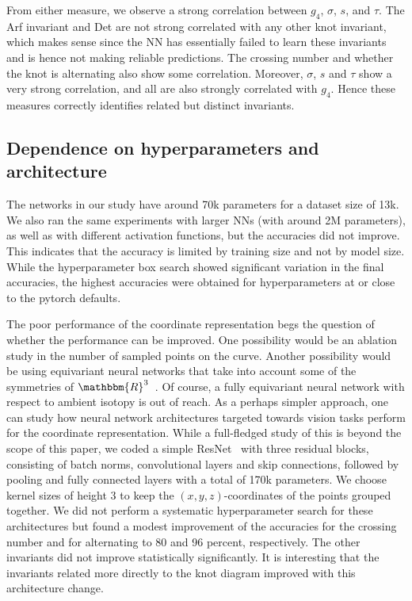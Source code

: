 \documentclass[11pt]{article}
\numberwithin{equation}{section}
\begin{document}
From either measure, we observe a strong correlation between $g_4$, $\sigma$, $s$, and $\tau$. The Arf invariant and Det are not strong correlated with any other knot invariant, which makes sense since the NN has essentially failed to learn these invariants and is hence not making reliable predictions. The crossing number and whether the knot is alternating also show some correlation. Moreover, $\sigma$, $s$ and $\tau$ show a very strong correlation, and all are also strongly correlated with $g_4$. Hence these measures correctly identifies related but distinct invariants.

\subsection{Dependence on hyperparameters and architecture}
The networks in our study have around 70k parameters for a dataset size of 13k. We also ran the same experiments with larger NNs (with around 2M parameters), as well as with different activation functions, but the accuracies did not improve. This indicates that the accuracy is limited by training size and not by model size. While the hyperparameter box search showed significant variation in the final accuracies, the highest accuracies were obtained for hyperparameters at or close to the pytorch defaults.

The poor performance of the coordinate representation begs the question of whether the performance can be improved. One possibility would be an ablation study in the number of sampled points on the curve. Another possibility would be using equivariant neural networks that take into account some of the symmetries of $\mathbbm{R}^3$~\cite{Geiger:2022aaa}. Of course, a fully equivariant neural network with respect to ambient isotopy is out of reach. As a perhaps simpler approach, one can study how neural network architectures targeted towards vision tasks perform for the coordinate representation. While a full-fledged study of this is beyond the scope of this paper, we coded a simple ResNet~\cite{He:2015ResNet} with three residual blocks, consisting of batch norms, convolutional layers and skip connections, followed by pooling and fully connected layers with a total of 170k parameters. We choose kernel sizes of height 3 to keep the $(x,y,z)$-coordinates of the points grouped together. We did not perform a systematic hyperparameter search for these architectures but found a modest improvement of the accuracies for the crossing number and for alternating to 80 and 96 percent, respectively. The other invariants did not improve statistically significantly. It is interesting that the invariants related more directly to the knot diagram improved with this architecture change. 
\end{document}
